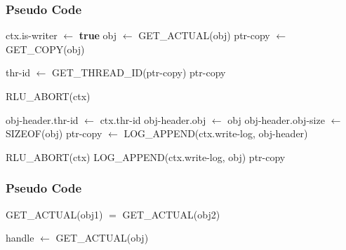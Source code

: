 \documentclass{beamer}
\begin{document}
\begin{frame}[t]
  \frametitle{Pseudo Code}

    \footnotesize{
    \begin{algorithmic}
      \State ctx.is-writer $\leftarrow$ \textbf{true} 
      \State obj $\leftarrow$ GET\_ACTUAL(obj)
      \State ptr-copy $\leftarrow$ GET\_COPY(obj)

      \State thr-id $\leftarrow$ GET\_THREAD\_ID(ptr-copy)
      \State \Return ptr-copy
      \EndIf

      \State RLU\_ABORT(ctx) 
      \EndIf

      \State obj-header.thr-id $\leftarrow$ ctx.thr-id
      \State obj-header.obj $\leftarrow$ obj
      \State obj-header.obj-size $\leftarrow$ SIZEOF(obj)
      \State ptr-copy $\leftarrow$ LOG\_APPEND(ctx.write-log, obj-header)

       
      \State RLU\_ABORT(ctx)
      \EndIf
      \State LOG\_APPEND(ctx.write-log, obj) 
      \State \Return ptr-copy
      \EndFunction
    \end{algorithmic}
  }
  
\end{frame}


\begin{frame}[t]
  \frametitle{Pseudo Code}
  
  \footnotesize{
    \begin{algorithmic}
      \State \Return GET\_ACTUAL(obj1) $=$ GET\_ACTUAL(obj2)
      \EndFunction

    \end{algorithmic}

    \begin{algorithmic}
      \State *handle $\leftarrow$ GET\_ACTUAL(obj)
      \EndFunction
    \end{algorithmic}
  }

\end{frame}

\end{document}
